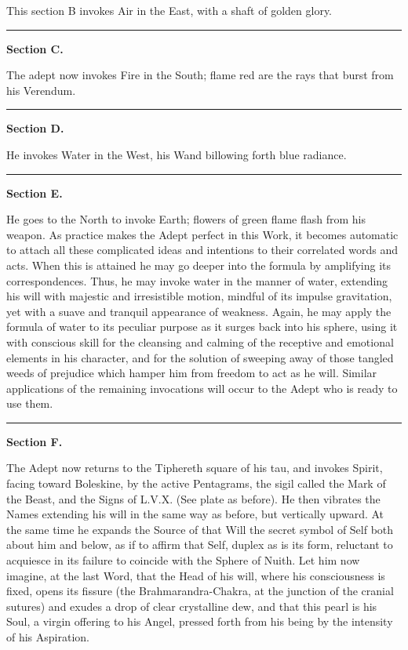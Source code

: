 This section B invokes Air in the East, with a shaft of golden glory.


\begin{center}
\rule{1in}{0.5pt}
\end{center}

\pagebreak[1]
\textbf{Section C.}


The adept now invokes Fire in the South; flame red are the rays that burst from his Verendum.


\begin{center}
\rule{1in}{0.5pt}
\end{center}

\pagebreak[1]
\textbf{Section D.}


He invokes Water in the West, his Wand billowing forth blue radiance.


\begin{center}
\rule{1in}{0.5pt}
\end{center}

\pagebreak[1]
\textbf{Section E.}


He goes to the North to invoke Earth; flowers of green flame flash from his weapon. As practice makes the Adept perfect in this Work, it becomes automatic to attach all these complicated ideas and intentions to their correlated words and acts. When this is attained he may go deeper into the formula by amplifying its correspondences. Thus, he may invoke water in the manner of water, extending his will with majestic and irresistible motion, mindful of its impulse gravitation, yet with a suave and tranquil appearance of weakness. Again, he may apply the formula of water to its peculiar purpose as it surges back into his sphere, using it with conscious skill for the cleansing and calming of the receptive and emotional elements in his character, and for the solution of sweeping away of those tangled weeds of prejudice which hamper him from freedom to act as he will. Similar applications of the remaining invocations will occur to the Adept who is ready to use them.


\begin{center}
\rule{1in}{0.5pt}
\end{center}

\pagebreak[1]
\textbf{Section F.}


The Adept now returns to the Tiphereth square of his tau, and invokes Spirit, facing toward Boleskine, by the active Pentagrams, the sigil called the Mark of the Beast, and the Signs of L.V.X. (See plate as before). He then vibrates the Names extending his will in the same way as before, but vertically upward. At the same time he expands the Source of that Will \textemdash{} the secret symbol of Self \textemdash{} both about him and below, as if to affirm that Self, duplex as is its form, reluctant to acquiesce in its failure to coincide with the Sphere of Nuith. Let him now imagine, at the last Word, that the Head of his will, where his consciousness is fixed, opens its fissure (the Brahmarandra-Chakra, at the junction of the cranial sutures) and exudes a drop of clear crystalline dew, and that this pearl is his Soul, a virgin offering to his Angel, pressed forth from his being by the intensity of his Aspiration.



